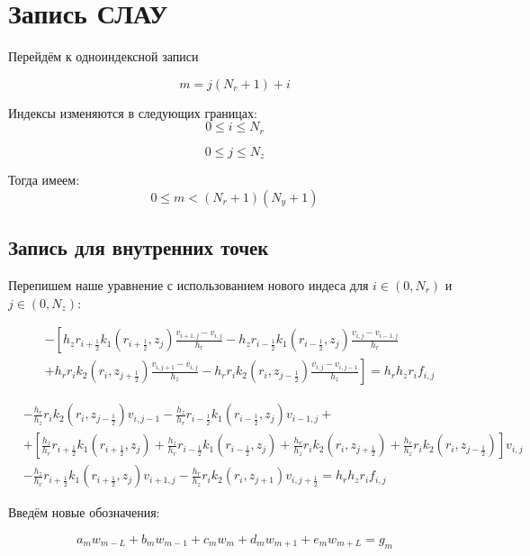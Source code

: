 \section{Запись СЛАУ}

Перейдём к одноиндексной записи

\[
  m = j(N_r + 1) + i
\]

Индексы изменяются в следующих границах:
\[
  0 \leq i \leq N_r
\]

\[
  0 \leq j \leq N_z
\]

Тогда имеем:
\[
  0 \leq m < (N_r + 1)(N_y + 1)
\]

\subsection{Запись для внутренних точек}
Перепишем наше уравнение с использованием нового индеса для $ i \in (0, N_r)$ и $ j \in (0, N_z) $:

\begin{align*}
  &- \left [ 
  h_z r_{i+\frac{1}{2}} k_1(r_{i+\frac{1}{2}}, z_j) \frac{v_{i+1, j} - v_{i, j}}{h_{r}}
  - h_z r_{i-\frac{1}{2}} k_1(r_{i-\frac{1}{2}}, z_j) \frac{v_{i, j} - v_{i - 1, j}}{h_{r}}
  \right . \\
  &\left .
  + h_r r_{i} k_2(r_i, z_{j+\frac{1}{2}}) \frac{v_{i, j + 1} - v_{i, j}}{h_{z}}
  - h_r r_{i} k_2(r_i, z_{j-\frac{1}{2}}) \frac{v_{i, j} - v_{i, j - 1}}{h_z}
  \right ]  = h_r h_z r_i f_{i, j}
\end{align*}

\begin{align*}
  & -\frac{h_r}{h_z} r_i k_2(r_i, z_{j - \frac{1}{2}}) v_{i, j - 1} - \frac{h_z}{h_r} r_{i - \frac{1}{2}} k_1(r_{i - \frac{1}{2}}, z_j) v_{i - 1, j} + \\
  & + \left[ 
    \frac{h_z}{h_r} r_{i + \frac{1}{2}} k_1(r_{i + \frac{1}{2}}, z_j) + \frac{h_z}{h_r} r_{i - \frac{1}{2}} k_1(r_{i - \frac{1}{2}}, z_j) +
    \frac{h_r}{h_z} r_i k_2 (r_i, z_{j + \frac{1}{2}}) + \frac{h_r}{h_z} r_i k_2 (r_i, z_{j-\frac{1}{2}})
   \right] v_{i, j} \\
  & - \frac{h_z}{h_r} r_{i + \frac{1}{2}} k_1(r_{i+ \frac{1}{2}}, z_j) v_{i + 1, j} - \frac{h_r}{h_z} r_i k_2(r_i, z_{j + 1}) v_{i, j + \frac{1}{2}}
  = h_r h_z r_i f_{i, j}
\end{align*}

Введём новые обозначения:

\[
  a_m w_{m - L} + b_m w_{m - 1} + c_m w_m + d_m w_{m + 1} + e_m w_{m + L} = g_m
\]

